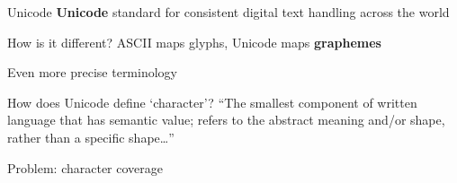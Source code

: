 \documentclass[../index.tex]{subfiles}
\begin{document}
\renewcommand{\currenttitle}{Unicode}
\begin{frame}{\currenttitle}
%
%
  \textbf{Unicode} \textendash{} standard for consistent digital text handling across the world
\end{frame}

\renewcommand{\currenttitle}{How is it different?}
\begin{frame}{\currenttitle}
%
  ASCII maps glyphs, Unicode maps \textbf{graphemes}
\end{frame}

\renewcommand{\currenttitle}{Even more precise terminology}
\begin{frame}{\currenttitle}
\end{frame}

\renewcommand{\currenttitle}{How does Unicode define `character'?}
\begin{frame}{\currenttitle}
  ``The smallest component of written language that has semantic value; refers to the
    abstract meaning and/or shape, rather than a specific shape\ldots''
\end{frame}

\renewcommand{\currenttitle}{Problem: character coverage}
\begin{frame}{\currenttitle}
%
%
%
\end{frame}
\end{document}
